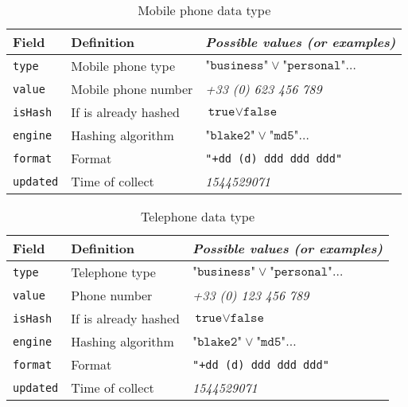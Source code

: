 \documentclass[twoside,twocolumn]{article}
\theoremstyle{definition}
\theoremstyle{remark}
\begin{document}
\begin{table}[htb]
    \centering
    \caption{Mobile phone data type}
    \begin{tabular*}{0.75\textwidth}{l|l||l}
        Field & Definition & \textit{Possible values (or examples)} \\
        \hline \hline
        \texttt{type} & Mobile phone type & $\texttt{"business"} \vee \texttt{"personal"} \dots$ \\
        \hline
        \texttt{value} & Mobile phone number & \textit{+33 (0) 623 456 789} \\
        \hline
        \texttt{isHash} & If is already hashed & $\texttt{true} \vee \texttt{false}$ \\
        \hline
        \texttt{engine} & Hashing algorithm & $\texttt{"blake2"} \vee \texttt{"md5"} \dots$ \\
        \hline
        \texttt{format} & Format & \texttt{"+dd (d) ddd ddd ddd"} \\
        \hline
        \texttt{updated} & Time of collect & \textit{1544529071}
        \label{table:mobiles}
    \end{tabular*}
\end{table}

\begin{table}[htb]
    \centering
    \caption{Telephone data type}
    \begin{tabular*}{0.75\textwidth}{l|l||l}
        Field & Definition & \textit{Possible values (or examples)} \\
        \hline \hline
        \texttt{type} & Telephone type & $\texttt{"business"} \vee \texttt{"personal"} \dots$ \\
        \hline
        \texttt{value} & Phone number & \textit{+33 (0) 123 456 789} \\
        \hline
        \texttt{isHash} & If is already hashed & $\texttt{true} \vee \texttt{false}$ \\
        \hline
        \texttt{engine} & Hashing algorithm & $\texttt{"blake2"} \vee \texttt{"md5"} \dots$ \\
        \hline
        \texttt{format} & Format & \texttt{"+dd (d) ddd ddd ddd"} \\
        \hline
        \texttt{updated} & Time of collect & \textit{1544529071}
        \label{table:phones}
    \end{tabular*}
\end{table}
\end{document}
